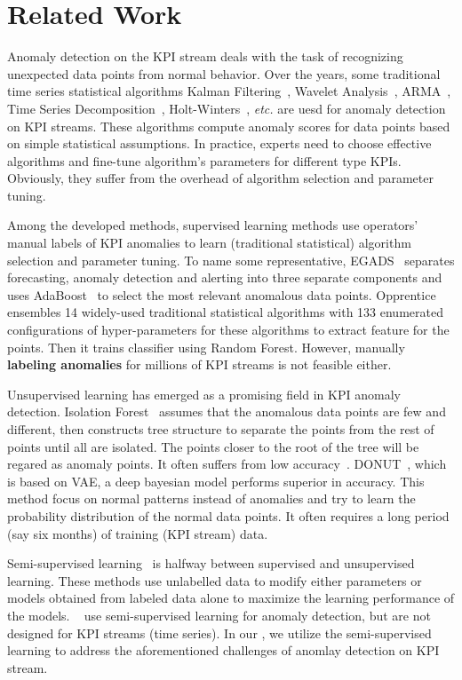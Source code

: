 \section{Related Work}
\label{sec:related}

Anomaly detection on the KPI stream deals with the task of recognizing unexpected data points from normal behavior.
Over the years, some traditional time series statistical algorithms Kalman Filtering~\cite{knorn2008adaptive}, Wavelet Analysis~\cite{lu2009network}, ARMA~\cite{pincombe2005anomaly}, Time Series Decomposition~\cite{chen2013provider}, Holt-Winters~\cite{yan2012argus}, \emph{etc.} are uesd for anomaly detection on KPI streams. These algorithms compute anomaly scores for data points based on simple statistical assumptions. In practice, experts need to choose effective algorithms and fine-tune algorithm's parameters for different type KPIs. Obviously, they suffer from the overhead of algorithm selection and parameter tuning.

Among the developed methods, supervised learning methods use operators' manual labels of KPI anomalies to learn (traditional statistical) algorithm selection and parameter tuning. To name some representative, EGADS~\cite{egads} separates forecasting, anomaly detection and alerting into three separate components and uses AdaBoost~\cite{freund1997decision} to select the most relevant anomalous data points. Opprentice~\cite{liu2015opprentice} ensembles 14 widely-used traditional statistical algorithms with 133 enumerated configurations of hyper-parameters for these algorithms to extract feature for the points. Then it trains classifier using Random Forest. However, manually \textbf{labeling anomalies} for millions of KPI streams is not feasible either.

Unsupervised learning has emerged as a promising field in KPI anomaly detection. Isolation Forest~\cite{liu2012isolation} assumes that the anomalous data points are few and different, then constructs tree structure to separate the points from the rest of points until all are isolated. The points closer to the root of the tree will be regared as anomaly points. It often suffers from low accuracy~\cite{zhang2018anomaly}.
DONUT~\cite{xu2018unsupervised}, which is based on VAE, a deep bayesian model performs superior in accuracy. This method focus on normal patterns instead of anomalies and try to learn the probability distribution of the normal data points. It often requires a long period (say six months) of training (KPI stream) data.

Semi-supervised learning~\cite{zhou2014semi} is halfway between supervised and unsupervised learning. These methods use unlabelled data to modify either parameters or models obtained from labeled data alone to maximize the learning performance of the models. ~\cite{sillito2008semi, ashfaq2017fuzziness, noto2012frac} use semi-supervised learning for anomaly detection, but are not designed for KPI streams (time series). In our \name{}, we utilize the semi-supervised learning to address the aforementioned challenges of anomlay detection on KPI stream.